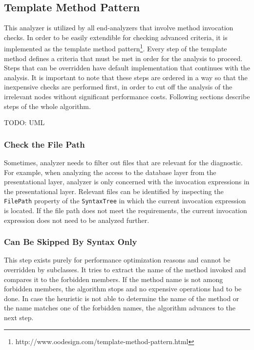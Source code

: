 \documentclass[
  digital, %
  table,   %
  lof,     %
  lot,     %
  oneside,
]{fithesis3}
\begin{document}
\subsection{Template Method Pattern}
This analyzer is utilized by all end-analyzers that involve method invocation checks. In order to be easily extendible for checking advanced criteria, it is implemented as the template method pattern\footnote{http://www.oodesign.com/template-method-pattern.html}. Every step of the template method defines a criteria that must be met in order for the analysis to proceed. Steps that can be overridden have default implementation that continues with the analysis. It is important to note that these steps are ordered in a way so that the inexpensive checks are performed first, in order to cut off the analysis of the irrelevant nodes without significant performance costs. Following sections describe steps of the whole algorithm.

TODO: UML 

\subsubsection{Check the File Path}
Sometimes, analyzer needs to filter out files that are relevant for the diagnostic. For example, when analyzing the access to the database layer from the presentational layer, analyzer is only concerned with the invocation expressions in the presentational layer. Relevant files can be identified by inspecting the \texttt{FilePath} property of the \texttt{SyntaxTree} in which the current invocation expression is located. If the file path does not meet the requirements, the current invocation expression does not need to be analyzed further.

\subsubsection{Can Be Skipped By Syntax Only}
This step exists purely for performance optimization reasons and cannot be overridden by subclasses. It tries to extract the name of the method invoked and compares it to the forbidden members. If the method name is not among forbidden members, the algorithm stops and no expensive operations had to be done. In case the heuristic is not able to determine the name of the method or the name matches one of the forbidden names, the algorithm advances to the next step.
\end{document}
